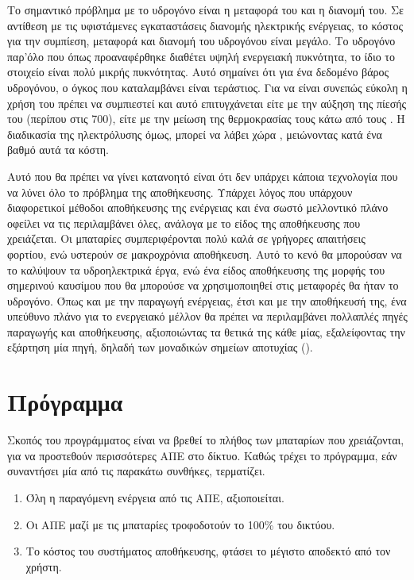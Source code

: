 \documentclass[12pt]{report}
\begin{document}
Το σημαντικό πρόβλημα με το υδρογόνο είναι η μεταφορά του και η διανομή του. Σε αντίθεση με τις υφιστάμενες εγκαταστάσεις διανομής ηλεκτρικής ενέργειας, το κόστος για την συμπίεση, μεταφορά και διανομή του υδρογόνου είναι μεγάλο.
Το υδρογόνο παρ'όλο που όπως προαναφέρθηκε διαθέτει υψηλή ενεργειακή πυκνότητα, το ίδιο το στοιχείο είναι πολύ μικρής πυκνότητας. Αυτό σημαίνει ότι για ένα δεδομένο βάρος υδρογόνου, ο όγκος που καταλαμβάνει είναι τεράστιος.
Για να είναι συνεπώς εύκολη η χρήση του πρέπει να συμπιεστεί και αυτό επιτυγχάνεται είτε με την αύξηση της πίεσής του (περίπου στις 700{}), είτε με την μείωση της θερμοκρασίας τους κάτω από τους 
{}. Η διαδικασία της ηλεκτρόλυσης όμως, μπορεί να λάβει χώρα {}, μειώνοντας κατά ένα βαθμό αυτά τα κόστη.

\begin{center}
\end{center}

Αυτό που θα πρέπει να γίνει κατανοητό είναι ότι δεν υπάρχει κάποια τεχνολογία που να λύνει όλο το πρόβλημα της αποθήκευσης. Υπάρχει λόγος που υπάρχουν διαφορετικοί μέθοδοι αποθήκευσης της ενέργειας και ένα σωστό μελλοντικό
πλάνο οφείλει να τις περιλαμβάνει όλες, ανάλογα με το είδος της αποθήκευσης που χρειάζεται. Οι μπαταρίες συμπεριφέρονται πολύ καλά σε γρήγορες απαιτήσεις φορτίου, ενώ υστερούν σε μακροχρόνια αποθήκευση. Αυτό το κενό θα
μπορούσαν να το καλύψουν τα υδροηλεκτρικά έργα, ενώ ένα είδος αποθήκευσης της μορφής του σημερινού καυσίμου που θα μπορούσε να χρησιμοποιηθεί στις μεταφορές θα ήταν το υδρογόνο. Όπως και με την παραγωγή ενέργειας, έτσι και
με την αποθήκευσή της, ένα υπεύθυνο πλάνο για το ενεργειακό μέλλον θα πρέπει να περιλαμβάνει πολλαπλές πηγές παραγωγής και αποθήκευσης, αξιοποιώντας τα θετικά της κάθε μίας, εξαλείφοντας την εξάρτηση μία πηγή, 
δηλαδή των μοναδικών σημείων αποτυχίας ({}).  
\chapter{Πρόγραμμα}
Σκοπός του προγράμματος είναι να βρεθεί το πλήθος των μπαταρίων που χρειάζονται, για να προστεθούν περισσότερες ΑΠΕ στο δίκτυο. Καθώς τρέχει το πρόγραμμα, εάν συναντήσει μία από τις παρακάτω συνθήκες, τερματίζει.

\begin{enumerate}[label=\roman*]
				\item Όλη η παραγόμενη ενέργεια από τις ΑΠΕ, αξιοποιείται.
				\item Οι ΑΠΕ μαζί με τις μπαταρίες τροφοδοτούν το 100\% του δικτύου.
				\item Το κόστος του συστήματος αποθήκευσης, φτάσει το μέγιστο αποδεκτό από τον χρήστη.
\end{enumerate}
\end{document}

